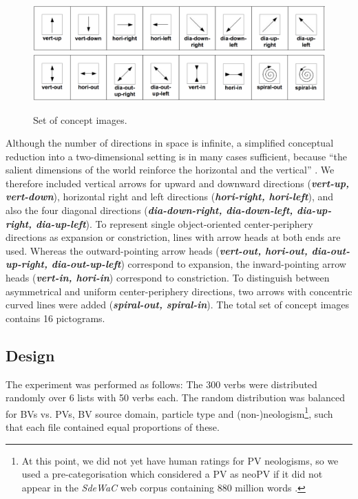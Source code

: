 \documentclass[output=paper]{langsci/langscibook}
\newcommand{\textci}[1]{\textit{\textbf{#1}}}
\begin{document}
\begin{figure}[htbp]
  \vspace{+2mm}
  \caption{Set of concept images.}
  \label{fig:CIdir}
  \hspace*{+1mm}\includegraphics[width=.95\linewidth]{figures/CIs-1-8.png}
  \vspace{+3mm}\\
  \includegraphics[width=.95\linewidth]{figures/CIs-9-16}
\end{figure}

Although the number of directions in space is infinite, a simplified
conceptual reduction into a two-dimensional setting is in many cases
sufficient, because ``the salient dimensions of the world reinforce
the horizontal and the vertical'' \citep{Tversky:11}. We therefore
included vertical arrows for upward and downward directions
(\textci{vert-up, vert-down}), horizontal right and left directions
(\textci{hori-right, hori-left}), and also the four diagonal
directions (\textci{dia-down-right, dia-down-left, dia-up-right,
  dia-up-left}). To represent single object-oriented center-periphery
directions as expansion or constriction, lines with arrow heads at
both ends are used. Whereas the outward-pointing arrow heads
(\textci{vert-out, hori-out, dia-out-up-right, dia-out-up-left})
correspond to expansion, the inward-pointing arrow heads
(\textci{vert-in, hori-in}) correspond to constriction. To distinguish
between asymmetrical and uniform center-periphery directions, two
arrows with concentric curved lines were added (\textci{spiral-out,
  spiral-in}). The total set of concept images contains 16 pictograms.


\subsection{Design}
\label{sec:design}

The experiment was performed as follows: The 300 verbs were
distributed randomly over 6 lists with 50 verbs each. The random
distribution was balanced for BVs vs. PVs, BV source domain, particle
type and (non-)neologism\footnote{At this point, we did not yet have
  human ratings for PV neologisms, so we used a pre-categorisation
  which considered a PV as neoPV if it did not appear in the
  \textit{SdeWaC} web corpus containing 880 million words
  \citep{Faass/Eckart:13}.}, such that each file contained equal
proportions of these.
\end{document}
